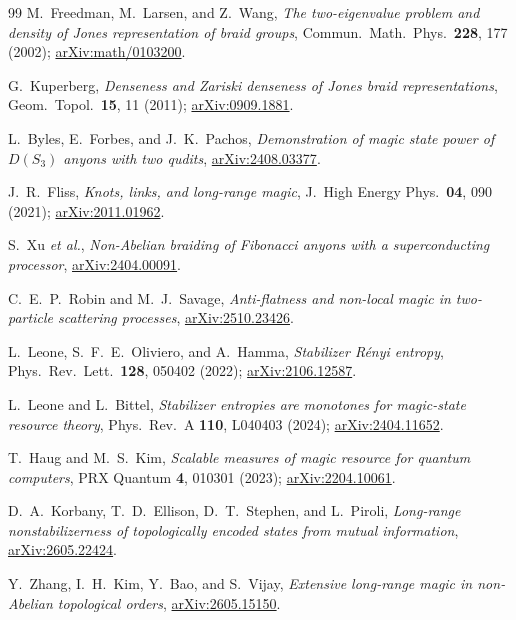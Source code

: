 \documentclass[aps,pra,twocolumn,superscriptaddress,longbibliography,floatfix,nofootinbib]{revtex4-2}
\begin{document}
\begin{thebibliography}{99}
M.~Freedman, M.~Larsen, and Z.~Wang,
\emph{The two-eigenvalue problem and density of Jones representation
of braid groups},
Commun.\ Math.\ Phys.\ \textbf{228}, 177 (2002);
\href{https://arxiv.org/abs/math/0103200}{arXiv:math/0103200}.

G.~Kuperberg,
\emph{Denseness and Zariski denseness of Jones braid representations},
Geom.\ Topol.\ \textbf{15}, 11 (2011);
\href{https://arxiv.org/abs/0909.1881}{arXiv:0909.1881}.

L.~Byles, E.~Forbes, and J.~K.~Pachos,
\emph{Demonstration of magic state power of $D(S_3)$ anyons with two
qudits},
\href{https://arxiv.org/abs/2408.03377}{arXiv:2408.03377}.

J.~R.~Fliss,
\emph{Knots, links, and long-range magic},
J.\ High Energy Phys.\ \textbf{04}, 090 (2021);
\href{https://arxiv.org/abs/2011.01962}{arXiv:2011.01962}.

S.~Xu \emph{et al.},
\emph{Non-Abelian braiding of Fibonacci anyons with a superconducting
processor},
\href{https://arxiv.org/abs/2404.00091}{arXiv:2404.00091}.

C.~E.~P.~Robin and M.~J.~Savage,
\emph{Anti-flatness and non-local magic in two-particle scattering
processes},
\href{https://arxiv.org/abs/2510.23426}{arXiv:2510.23426}.

L.~Leone, S.~F.~E.~Oliviero, and A.~Hamma,
\emph{Stabilizer Rényi entropy},
Phys.\ Rev.\ Lett.\ \textbf{128}, 050402 (2022);
\href{https://arxiv.org/abs/2106.12587}{arXiv:2106.12587}.

L.~Leone and L.~Bittel,
\emph{Stabilizer entropies are monotones for magic-state resource
theory},
Phys.\ Rev.\ A \textbf{110}, L040403 (2024);
\href{https://arxiv.org/abs/2404.11652}{arXiv:2404.11652}.

T.~Haug and M.~S.~Kim,
\emph{Scalable measures of magic resource for quantum computers},
PRX Quantum \textbf{4}, 010301 (2023);
\href{https://arxiv.org/abs/2204.10061}{arXiv:2204.10061}.

D.~A.~Korbany, T.~D.~Ellison, D.~T.~Stephen, and L.~Piroli,
\emph{Long-range nonstabilizerness of topologically encoded states
from mutual information},
\href{https://arxiv.org/abs/2605.22424}{arXiv:2605.22424}.

Y.~Zhang, I.~H.~Kim, Y.~Bao, and S.~Vijay,
\emph{Extensive long-range magic in non-Abelian topological orders},
\href{https://arxiv.org/abs/2605.15150}{arXiv:2605.15150}.


\end{thebibliography}
\end{document}

